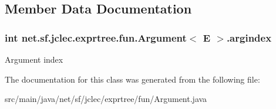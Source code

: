 \subsection{Member Data Documentation}
\hypertarget{classnet_1_1sf_1_1jclec_1_1exprtree_1_1fun_1_1_argument_3_01_e_01_4_ab11c82b51e183d019a0d916c2841e5cc}{
\subsubsection[{argindex}]{\setlength{\rightskip}{0pt plus 5cm}int net.\-sf.\-jclec.\-exprtree.\-fun.\-Argument$<$ E $>$.argindex\hspace{0.3cm}{\ttfamily [protected]}}}\label{classnet_1_1sf_1_1jclec_1_1exprtree_1_1fun_1_1_argument_3_01_e_01_4_ab11c82b51e183d019a0d916c2841e5cc}
Argument index 

The documentation for this class was generated from the following file\-:\begin{DoxyCompactItemize}
\item 
src/main/java/net/sf/jclec/exprtree/fun/Argument.\-java\end{DoxyCompactItemize}
